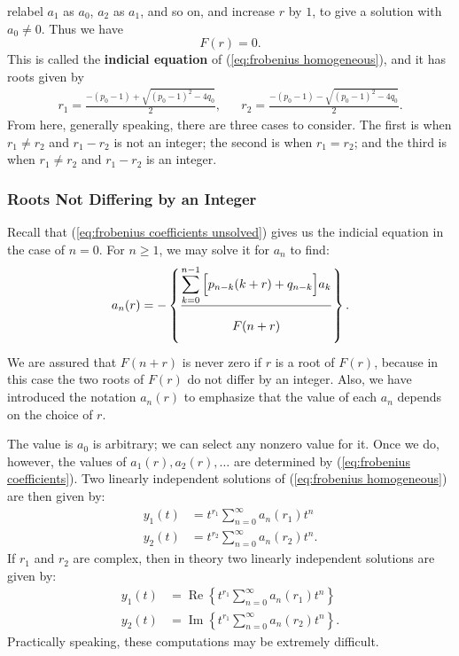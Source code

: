 \documentclass{myart}
\newcommand{\term}[1]{\textbf{#1}}
\newcommand{\eq}[1]{(\ref{eq:#1})}
\DeclareMathOperator{\OpRe}{Re}
\DeclareMathOperator{\OpIm}{Im}
\renewcommand{\Re}[1]{\OpRe\left\{#1\right\}}
\renewcommand{\Im}[1]{\OpIm\left\{#1\right\}}
\begin{document}
relabel $a_1$ as $a_0$, $a_2$ as $a_1$, and so on, and increase $r$ by
$1$, to give a solution with $a_0 \neq 0$. Thus we have
\begin{equation*}
  F(r) = 0.
\end{equation*}
This is called the \term{indicial equation} of \eq{frobenius
  homogeneous}, and it has roots given by
\begin{align} \label{eq:indicial equation roots}
     r_1 = \frac{-(p_0 - 1) + \sqrt{(p_0 - 1)^2 - 4q_0}}{2},
  && r_2 = \frac{-(p_0 - 1) - \sqrt{(p_0 - 1)^2 - 4q_0}}{2}.
\end{align}
From here, generally speaking, there are three cases to consider. The
first is when $r_1 \neq r_2$ and $r_1 - r_2$ is not an integer; the
second is when $r_1 = r_2$; and the third is when $r_1 \neq r_2$ and
$r_1 - r_2$ is an integer.

\subsubsection{Roots Not Differing by an Integer}
\label{subsubsec:frobenius roots not differing by an integer}

Recall that \eq{frobenius coefficients unsolved} gives us the indicial
equation in the case of $n = 0$. For $n \geq 1$, we may solve it for
$a_n$ to find:
\begin{equation} \label{eq:frobenius coefficients}
  a_n(r) = -\left\{\frac{
      \displaystyle \sum_{k=0}^{n-1}
        \Big[p_{n-k} (k+r) + q_{n-k}\Big] a_k
    }{
      \displaystyle \vphantom{\sum_0^0} F(n + r)
    }\right\}.
\end{equation}
We are assured that $F(n + r)$ is never zero if $r$ is a root of
$F(r)$, because in this case the two roots of $F(r)$ do not differ by
an integer. Also, we have introduced the notation $a_n(r)$ to
emphasize that the value of each $a_n$ depends on the choice of $r$.

The value is $a_0$ is arbitrary; we can select any nonzero value for
it. Once we do, however, the values of $a_1(r), a_2(r), \ldots$ are
determined by \eq{frobenius coefficients}. Two linearly independent
solutions of \eq{frobenius homogeneous} are then given by:
\begin{align*}
  y_1(t) &= t^{r_1} \sum_{n=0}^\infty a_n(r_1) t^n \\
  y_2(t) &= t^{r_2} \sum_{n=0}^\infty a_n(r_2) t^n.
\end{align*}
If $r_1$ and $r_2$ are complex, then in theory two linearly
independent solutions are given by:
\begin{align*}
  y_1(t) &= \Re{t^{r_1} \sum_{n=0}^\infty a_n(r_1) t^n} \\
  y_2(t) &= \Im{t^{r_1} \sum_{n=0}^\infty a_n(r_2) t^n}.
\end{align*}
Practically speaking, these computations may be extremely difficult.
\end{document}
